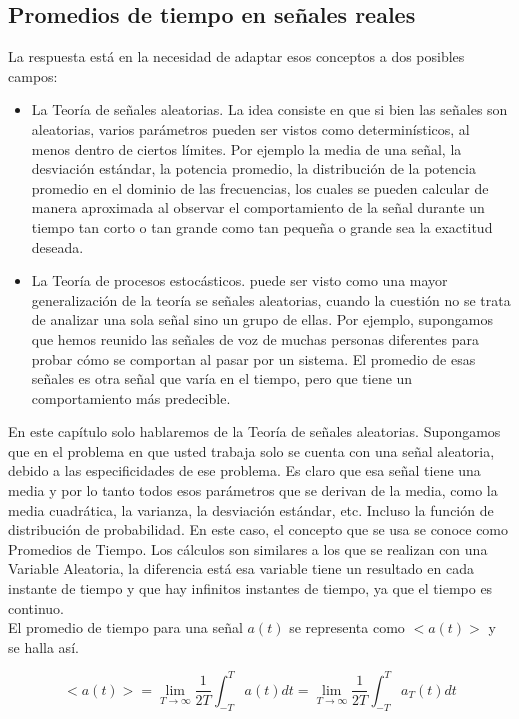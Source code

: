 \subsection{Promedios de tiempo en señales reales}
La respuesta está en la necesidad de adaptar esos conceptos a dos posibles campos:
\begin{itemize}
    \item La Teoría de señales aleatorias. La idea consiste en que si bien las señales son aleatorias, varios parámetros pueden ser vistos como determinísticos, al menos dentro de ciertos límites. Por ejemplo la media de una señal, la desviación estándar, la potencia promedio, la distribución de la potencia promedio en el dominio de las frecuencias, los cuales se pueden calcular de manera aproximada al observar el comportamiento de la señal durante un tiempo tan corto o tan grande como tan pequeña o grande sea la exactitud deseada.
    \item La Teoría de procesos estocásticos. puede ser visto como una mayor generalización de la teoría se señales aleatorias, cuando la cuestión no se trata de analizar una sola señal sino un grupo de ellas. Por ejemplo, supongamos que hemos reunido las señales de voz de muchas personas diferentes para probar cómo se comportan al pasar por un sistema. El promedio de esas señales es otra señal que varía en el tiempo, pero que tiene un comportamiento más predecible.
\end{itemize}

En este capítulo solo hablaremos de la Teoría de señales aleatorias. Supongamos que en el problema en que usted trabaja solo se cuenta con una señal aleatoria, debido a las especificidades de ese problema. Es claro que esa señal tiene una media y por lo tanto todos esos parámetros que se derivan de la media, como la media cuadrática, la varianza, la desviación estándar, etc. Incluso la función de distribución de probabilidad. En este caso, el concepto que se usa se conoce como Promedios de Tiempo. Los cálculos son similares a los que se realizan con una Variable Aleatoria, la diferencia está esa variable tiene un resultado en cada instante de tiempo y que hay infinitos instantes de tiempo, ya que el tiempo es continuo. \\

El promedio de tiempo para una señal $a(t)$ se representa como $<a(t)>$ y se halla así.

\begin{equation} \label{equ_veinticuatro}
<a(t)> = \lim_{T \to \infty} \frac{1}{2T} \int_{-T}^{T} a(t)dt = \lim_{T \to \infty} \frac{1}{2T} \int_{-T}^{T} a_{T}(t)dt 
\end{equation} 


